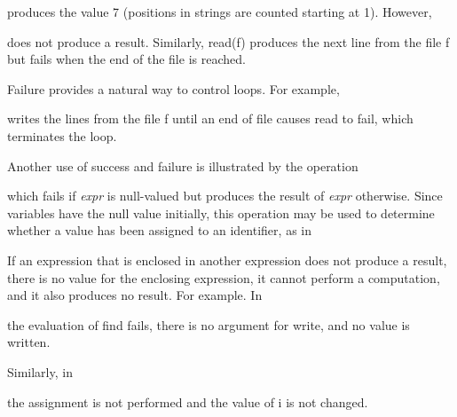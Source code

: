 \noindent
produces the value 7 (positions in strings are counted starting at 1). However,


\noindent
does not produce a result. Similarly, read(f) produces the next line from the file f but fails when the end of the file
is reached.


Failure provides a natural way to control loops. For example,


\noindent
writes the lines from the file f until an end of file causes read to fail, which terminates the loop.


Another use of success and failure is illustrated by the operation




which fails if \textit{expr }is null-valued but produces the result of \textit{expr }otherwise. Since variables have the
null value initially, this operation may be used to determine whether a value has been assigned to an identifier, as
in



If an expression that is enclosed in another expression does not produce a result, there is no value for the enclosing
expression, it cannot perform a computation, and it also produces no result. For example. In



\noindent the evaluation of find fails, there is no argument for write, and no value is written.

Similarly, in



\noindent the assignment is not performed and the value of i is not changed.


